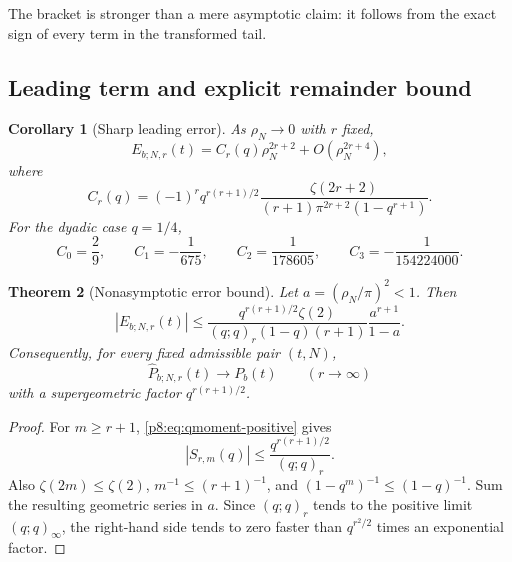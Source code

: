 \documentclass[11pt]{article}
\numberwithin{equation}{section}
\newtheorem{theorem}{Theorem}[section]
\newtheorem{corollary}[theorem]{Corollary}
\theoremstyle{definition}
\theoremstyle{remark}
\begin{document}
The bracket is stronger than a mere asymptotic claim: it follows from the exact sign of every term in the transformed tail.

\subsection{Leading term and explicit remainder bound}

\begin{corollary}[Sharp leading error]
\label{p8:cor:leading-error}
As $\rho_N\to0$ with $r$ fixed,
\begin{equation}
E_{b;N,r}(t)
=C_r(q)\rho_N^{2r+2}+O(\rho_N^{2r+4}),
\label{p8:eq:leading-error}
\end{equation}
where
\begin{equation}
C_r(q)=(-1)^r q^{r(r+1)/2}
\frac{\zeta(2r+2)}{(r+1)\pi^{2r+2}(1-q^{r+1})}.
\label{p8:eq:Cr}
\end{equation}
For the dyadic case $q=1/4$,
\begin{equation}
C_0=\frac29,\qquad
C_1=-\frac1{675},\qquad
C_2=\frac1{178605},\qquad
C_3=-\frac1{154224000}.
\label{p8:eq:Cr-dyadic}
\end{equation}
\end{corollary}

\begin{theorem}[Nonasymptotic error bound]
\label{p8:thm:error-bound}
Let $a=(\rho_N/\pi)^2<1$. Then
\begin{equation}
|E_{b;N,r}(t)|
\le
\frac{q^{r(r+1)/2}\zeta(2)}
{(q;q)_r(1-q)(r+1)}
\frac{a^{r+1}}{1-a}.
\label{p8:eq:error-bound}
\end{equation}
Consequently, for every fixed admissible pair $(t,N)$,
\begin{equation}
\widehat P_{b;N,r}(t)\longrightarrow P_b(t)
\qquad(r\to\infty)
\label{p8:eq:r-convergence}
\end{equation}
with a supergeometric factor $q^{r(r+1)/2}$.
\end{theorem}

\begin{proof}
For $m\ge r+1$, \cref{p8:eq:qmoment-positive} gives
\[
|S_{r,m}(q)|\le\frac{q^{r(r+1)/2}}{(q;q)_r}.
\]
Also $\zeta(2m)\le\zeta(2)$, $m^{-1}\le(r+1)^{-1}$, and $(1-q^m)^{-1}\le(1-q)^{-1}$. Sum the resulting geometric series in $a$. Since $(q;q)_r$ tends to the positive limit $(q;q)_\infty$, the right-hand side tends to zero faster than $q^{r^2/2}$ times an exponential factor.
\end{proof}
\end{document}
